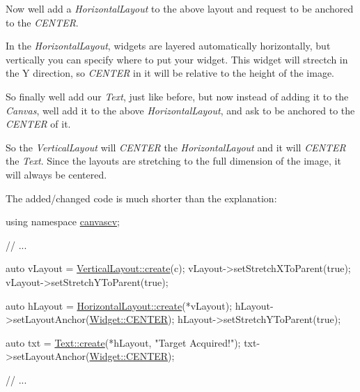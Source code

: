 Now we\textquotesingle{}ll add a {\itshape Horizontal\+Layout} to the above layout and request to be anchored to the {\itshape C\+E\+N\+T\+ER}.

In the {\itshape Horizontal\+Layout}, widgets are layered automatically horizontally, but vertically you can specify where to put your widget. This widget will strectch in the Y direction, so {\itshape C\+E\+N\+T\+ER} in it will be relative to the height of the image.

So finally we\textquotesingle{}ll add our {\itshape Text}, just like before, but now instead of adding it to the {\itshape Canvas}, we\textquotesingle{}ll add it to the above {\itshape Horizontal\+Layout}, and ask to be anchored to the {\itshape C\+E\+N\+T\+ER} of it.

So the {\itshape Vertical\+Layout} will {\itshape C\+E\+N\+T\+ER} the {\itshape Horizontal\+Layout} and it will {\itshape C\+E\+N\+T\+ER} the {\itshape Text}. Since the layouts are stretching to the full dimension of the image, it will always be centered.

The added/changed code is much shorter than the explanation\+: 
\begin{DoxyCode}
\textcolor{keyword}{using namespace }\hyperlink{namespacecanvascv}{canvascv};

\textcolor{comment}{// ...}

\textcolor{keyword}{auto} vLayout = \hyperlink{classcanvascv_1_1VerticalLayout_a3e0ae249db062663815d2d822e178dd3}{VerticalLayout::create}(c);
vLayout->setStretchXToParent(\textcolor{keyword}{true});
vLayout->setStretchYToParent(\textcolor{keyword}{true});

\textcolor{keyword}{auto} hLayout = \hyperlink{classcanvascv_1_1HorizontalLayout_aea31dd787cbf985687ead6a55efa1839}{HorizontalLayout::create}(*vLayout);
hLayout->setLayoutAnchor(\hyperlink{classcanvascv_1_1Widget_a98ca3c300ba50b316fa5a1d300456abea2cd62693af40f3c5f559a07d6a61a55d}{Widget::CENTER});
hLayout->setStretchYToParent(\textcolor{keyword}{true});

\textcolor{keyword}{auto} txt = \hyperlink{classcanvascv_1_1Text_a7f3552263b6f185f78d90549e7ac38f7}{Text::create}(*hLayout, \textcolor{stringliteral}{"Target Acquired!"});
txt->setLayoutAnchor(\hyperlink{classcanvascv_1_1Widget_a98ca3c300ba50b316fa5a1d300456abea2cd62693af40f3c5f559a07d6a61a55d}{Widget::CENTER});

\textcolor{comment}{// ...}
\end{DoxyCode}


